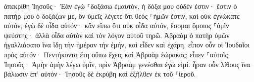 \documentclass{openreader}
\begin{document}
ἀπεκρίθη Ἰησοῦς· Ἐὰν ἐγὼ ⸀δοξάσω ἐμαυτόν, ἡ δόξα μου οὐδέν ἐστιν· ἔστιν ὁ πατήρ μου ὁ δοξάζων με, ὃν ὑμεῖς λέγετε ὅτι θεὸς ⸀ἡμῶν ἐστιν, 
καὶ οὐκ ἐγνώκατε αὐτόν, ἐγὼ δὲ οἶδα αὐτόν· κἂν εἴπω ὅτι οὐκ οἶδα αὐτόν, ἔσομαι ὅμοιος ⸀ὑμῖν ψεύστης· ἀλλὰ οἶδα αὐτὸν καὶ τὸν λόγον αὐτοῦ τηρῶ. 
Ἀβραὰμ ὁ πατὴρ ὑμῶν ἠγαλλιάσατο ἵνα ἴδῃ τὴν ἡμέραν τὴν ἐμήν, καὶ εἶδεν καὶ ἐχάρη. 
εἶπον οὖν οἱ Ἰουδαῖοι πρὸς αὐτόν· Πεντήκοντα ἔτη οὔπω ἔχεις καὶ Ἀβραὰμ ἑώρακας; 
εἶπεν ⸀αὐτοῖς Ἰησοῦς· Ἀμὴν ἀμὴν λέγω ὑμῖν, πρὶν Ἀβραὰμ γενέσθαι ἐγὼ εἰμί. 
ἦραν οὖν λίθους ἵνα βάλωσιν ἐπ’ αὐτόν· Ἰησοῦς δὲ ἐκρύβη καὶ ἐξῆλθεν ἐκ τοῦ ⸀ἱεροῦ. 
\end{document}
